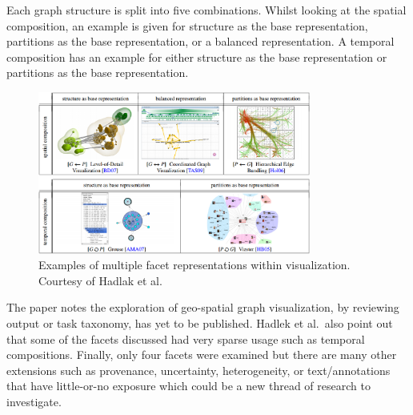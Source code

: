 Each graph structure is split into five combinations. Whilst looking at the spatial composition, an example is given for structure as the base representation, partitions as the base representation, or a balanced representation. A temporal composition has an example for either structure as the base representation or partitions as the base representation.

\begin{figure}[t]
\begin{center}
\includegraphics[width=0.8\textwidth]{images/hadlak2015survey.png}
\caption{Examples of multiple facet representations within visualization. Courtesy of Hadlak et al.\ \cite{hadlak2015survey}} \label{fig: hadlak2015survey}
\end{center}\vspace{-0.5cm}
\end{figure}

%

The paper notes the exploration of geo-spatial graph visualization, by reviewing output or task taxonomy, has yet to be published. Hadlek et al.\ also point out that some of the facets discussed had very sparse usage such as temporal compositions. Finally, only four facets were examined but there are many other extensions such as provenance, uncertainty, heterogeneity, or text/annotations that have little-or-no exposure which could be a new thread of research to investigate.


